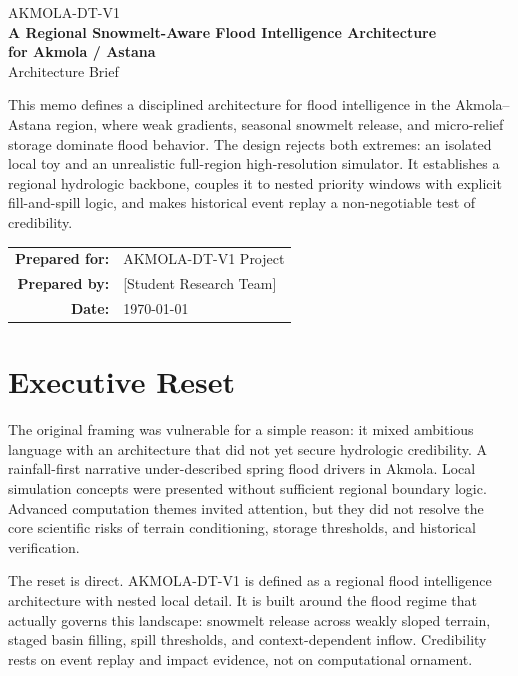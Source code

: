 \documentclass[11pt,a4paper]{article}
\begin{document}
\begin{titlepage}
  \centering
  \vspace*{2.5cm}
  {\Large\color{heading}\textsc{AKMOLA-DT-V1}}\\[0.6cm]
  {\huge\bfseries A Regional Snowmelt-Aware Flood Intelligence Architecture\\[0.2cm]
  for Akmola / Astana}\\[1.1cm]
  {\large Architecture Brief}\\[1.2cm]

  \begin{minipage}{0.88\textwidth}
    \small
    This memo defines a disciplined architecture for flood intelligence in the Akmola--Astana region, where weak gradients, seasonal snowmelt release, and micro-relief storage dominate flood behavior. The design rejects both extremes: an isolated local toy and an unrealistic full-region high-resolution simulator. It establishes a regional hydrologic backbone, couples it to nested priority windows with explicit fill-and-spill logic, and makes historical event replay a non-negotiable test of credibility.
  \end{minipage}

  \vfill
  \begin{tabular}{rl}
    \textbf{Prepared for:} & AKMOLA-DT-V1 Project\\
    \textbf{Prepared by:} & [Student Research Team]\\
    \textbf{Date:} & \today
  \end{tabular}
\end{titlepage}

\section{Executive Reset}

The original framing was vulnerable for a simple reason: it mixed ambitious language with an architecture that did not yet secure hydrologic credibility. A rainfall-first narrative under-described spring flood drivers in Akmola. Local simulation concepts were presented without sufficient regional boundary logic. Advanced computation themes invited attention, but they did not resolve the core scientific risks of terrain conditioning, storage thresholds, and historical verification.

The reset is direct. AKMOLA-DT-V1 is defined as a regional flood intelligence architecture with nested local detail. It is built around the flood regime that actually governs this landscape: snowmelt release across weakly sloped terrain, staged basin filling, spill thresholds, and context-dependent inflow. Credibility rests on event replay and impact evidence, not on computational ornament.
\end{document}
